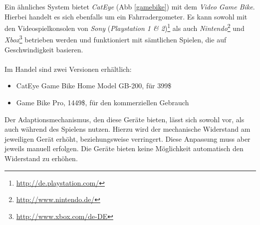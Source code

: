 			Ein ähnliches System bietet \textit{CatEye} (Abb \ref{gamebike}) mit dem \textit{Video Game Bike}. Hierbei 				handelt es sich ebenfalls um ein Fahrradergometer. Es kann sowohl mit den Videospielkonsolen von \textit{Sony} (\textit{Playstation 1 \& 2})\footnote{\url{http://de.playstation.com/}} als auch \textit{Nintendo}\footnote{\url{http://www.nintendo.de/}} und \textit{Xbox}\footnote{\url{http://www.xbox.com/de-DE}} betrieben werden und funktioniert mit sämtlichen Spielen, die auf Geschwindigkeit basieren.
			\\ \\
			 Im Handel sind zwei Versionen erhältlich:
			\begin{itemize}
				\item{CatEye Game Bike Home Model GB-200, für 399\$}
				\item{Game Bike Pro, 1449\$, für den kommerziellen Gebrauch}
			\end{itemize}
			Der Adaptionsmechanismus, den diese Geräte bieten, lässt sich sowohl vor, als auch während des Spielens 					nutzen. Hierzu wird der mechanische Widerstand am jeweiligen Gerät erhöht, beziehungsweise verringert. Diese Anpassung muss aber jeweils manuell erfolgen. Die Geräte bieten keine Möglichkeit automatisch den Widerstand zu erhöhen. 
